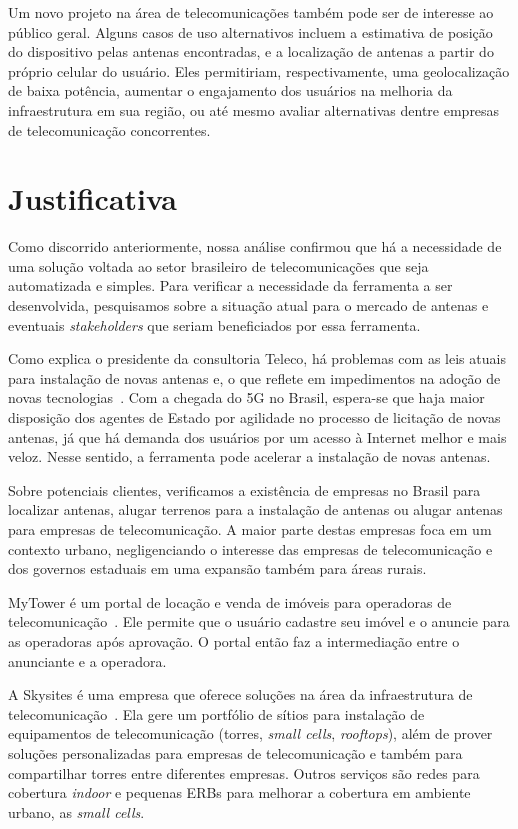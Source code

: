 \documentclass[]{politex}
\begin{document}
Um novo projeto na área de telecomunicações também pode ser de interesse ao
público geral. Alguns casos de uso alternativos incluem a estimativa de posição
do dispositivo pelas antenas encontradas, e a localização de antenas a partir do
próprio celular do usuário. Eles permitiriam, respectivamente, uma
geolocalização de baixa potência, aumentar o engajamento dos usuários na
melhoria da infraestrutura em sua região, ou até mesmo avaliar alternativas
dentre empresas de telecomunicação concorrentes.

\section{Justificativa}

Como discorrido anteriormente, nossa análise confirmou
que há a necessidade de uma solução voltada ao setor brasileiro de
telecomunicações que seja automatizada e simples. Para verificar a necessidade
da ferramenta a ser desenvolvida, pesquisamos sobre a situação atual para o
mercado de antenas e eventuais \textit{stakeholders} que seriam beneficiados por
essa ferramenta.

Como explica o presidente da consultoria Teleco, há problemas com as leis atuais
para instalação de novas antenas e, o que reflete em impedimentos na adoção de
novas tecnologias~\cite{tude}. Com a chegada do 5G no Brasil, espera-se que haja
maior disposição dos agentes de Estado por agilidade no processo de licitação de
novas antenas, já que há demanda dos usuários por um acesso à Internet melhor e
mais veloz. Nesse sentido, a ferramenta pode acelerar a instalação de novas
antenas.

Sobre potenciais clientes, verificamos a existência de empresas no Brasil para
localizar antenas, alugar terrenos para a instalação de antenas ou alugar
antenas para empresas de telecomunicação. A maior parte destas empresas foca em
um contexto urbano, negligenciando o interesse das empresas de telecomunicação e
dos governos estaduais em uma expansão também para áreas rurais.

MyTower é um portal de locação e venda de imóveis para operadoras de
telecomunicação~\cite{mytower}. Ele permite que o usuário cadastre seu imóvel e
o anuncie para as operadoras após aprovação. O portal então faz a intermediação
entre o anunciante e a operadora.

A Skysites é uma empresa que oferece soluções na área da infraestrutura de
telecomunicação~\cite{skysites}. Ela gere um portfólio de sítios para instalação
de equipamentos de telecomunicação (torres, \textit{small cells},
\textit{rooftops}), além de prover soluções personalizadas para empresas de
telecomunicação e também para compartilhar torres entre diferentes empresas.
Outros serviços são redes para cobertura \textit{indoor} e pequenas ERBs para
melhorar a cobertura em ambiente urbano, as \textit{small cells}.
\end{document}
